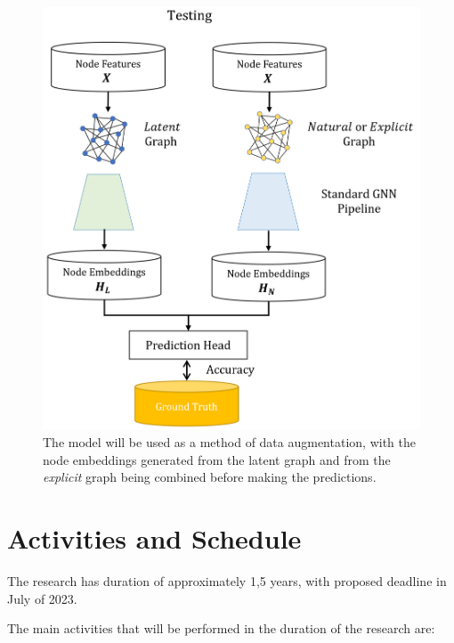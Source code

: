 \documentclass[12pt,a4paper]{article}
\begin{document}
	\begin{figure}[hbtp]
		\centering \includegraphics[scale=0.4]{eval_part3_2.png}
		\caption{The model will be used as a method of data augmentation, with the node embeddings generated from the latent graph and from the \emph{explicit} graph being combined before making the predictions. \label{eval3_2}}
	\end{figure}
	
	\section{Activities and Schedule}
	\label{sec:Activities_and_schedule}
	
	The research has duration of approximately 1,5 years, with proposed deadline in July of 2023.
	
	The main activities that will be performed in the duration of the research are: 
	
\end{document}
